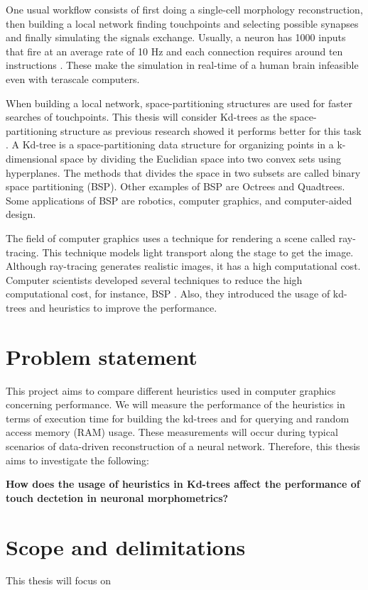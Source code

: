 One usual workflow consists of first doing a single-cell morphology reconstruction, then building a local network finding touchpoints and selecting possible synapses \cite{Reimann2015-ys} and finally simulating the signals exchange. Usually, a neuron has 1000 inputs that fire at an average rate of 10 Hz and each connection requires around ten instructions \cite{Furber2006}. These make the simulation in real-time of a human brain infeasible even with terascale computers.

When building a local network, space-partitioning structures are used for faster searches of touchpoints. This thesis will consider Kd-trees as the space-partitioning structure as previous research showed it performs better for this task \cite{Adamsson_Vorkapic_2016}. A Kd-tree is a space-partitioning data structure for organizing points in a k-dimensional space by dividing the Euclidian space into two convex sets using hyperplanes. The methods that divides the space in two subsets are called binary space partitioning (BSP). Other examples of BSP are Octrees and Quadtrees. Some applications of BSP are robotics, computer graphics, and computer-aided design.

The field of computer graphics uses a technique for rendering a scene called ray-tracing. This technique models light transport along the stage to get the image. Although ray-tracing generates realistic images, it has a high computational cost. Computer scientists developed several techniques to reduce the high computational cost, for instance, BSP \cite{Fuchs1980}. Also, they introduced the usage of kd-trees and heuristics to improve the performance\cite{WaldHavran06, Yucheng, LinjiaSaeidMajid, Bentley, 7169256}.

\section{Problem statement}
This project aims to compare different heuristics used in computer graphics concerning performance. We will measure the performance of the heuristics in terms of execution time for building the kd-trees and for querying and random access memory (RAM) usage. These measurements will occur during typical scenarios of data-driven reconstruction of a neural network. Therefore, this thesis aims to investigate the following:

\textbf{How does the usage of heuristics in Kd-trees affect the performance of touch dectetion in neuronal morphometrics? }

\section{Scope and delimitations}
This thesis will focus on

